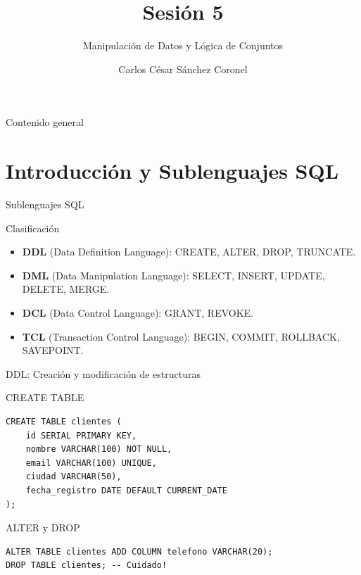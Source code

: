 \documentclass[aspectratio=169, 10pt, xcolor=table]{beamer}
\title[SESIÓN 5 BBDD]{\textbf{Sesión 5}}
\subtitle{Manipulación de Datos y Lógica de Conjuntos}
\author[Prof. C. Sánchez]{Carlos César Sánchez Coronel}
\institute{\textbf{BASES DE DATOS}}
\date{}
\begin{document}
\begin{frame}
    \titlepage
\end{frame}

\begin{frame}{Contenido general}
    \tableofcontents
\end{frame}

\section{Introducción y Sublenguajes SQL}

\begin{frame}{Sublenguajes SQL}
    \begin{block}{Clasificación}
        \begin{itemize}
            \item \textbf{DDL} (Data Definition Language): CREATE, ALTER, DROP, TRUNCATE.
            \item \textbf{DML} (Data Manipulation Language): SELECT, INSERT, UPDATE, DELETE, MERGE.
            \item \textbf{DCL} (Data Control Language): GRANT, REVOKE.
            \item \textbf{TCL} (Transaction Control Language): BEGIN, COMMIT, ROLLBACK, SAVEPOINT.
        \end{itemize}
    \end{block}
\end{frame}

\begin{frame}[fragile]{DDL: Creación y modificación de estructuras}
    \begin{exampleblock}{CREATE TABLE}
        \begin{lstlisting}
CREATE TABLE clientes (
    id SERIAL PRIMARY KEY,
    nombre VARCHAR(100) NOT NULL,
    email VARCHAR(100) UNIQUE,
    ciudad VARCHAR(50),
    fecha_registro DATE DEFAULT CURRENT_DATE
);
        \end{lstlisting}
    \end{exampleblock}
    \begin{exampleblock}{ALTER y DROP}
        \begin{lstlisting}
ALTER TABLE clientes ADD COLUMN telefono VARCHAR(20);
DROP TABLE clientes; -- Cuidado!
        \end{lstlisting}
    \end{exampleblock}
\end{frame}
\end{document}
